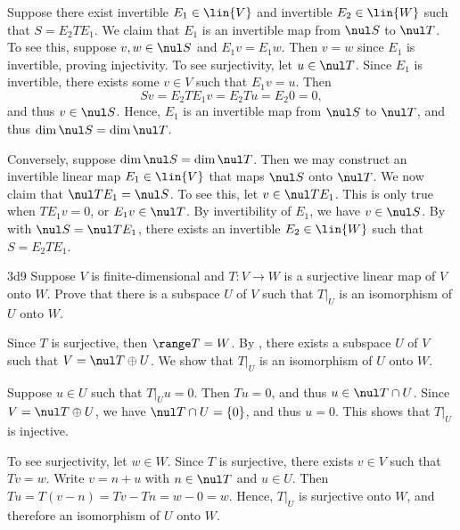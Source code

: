 \begin{sol}
    Suppose there exist invertible $E_1 \in \lin{V}$ and invertible $E_2 \in \lin{W}$ such that $S = E_2 T E_1$.
	We claim that $E_1$ is an invertible map from $\nul S$ to $\nul T$.
	To see this, suppose $v, w \in \nul S$ and $E_1 v = E_1 w$.
	Then $v = w$ since $E_1$ is invertible, proving injectivity.
	To see surjectivity, let $u \in \nul T$.
	Since $E_1$ is invertible, there exists some $v \in V$ such that $E_1 v = u$.
	Then
    \[
    	Sv = E_2 T E_1 v = E_2 T u = E_2 0 = 0,
    \]
    and thus $v \in \nul S$.
	Hence, $E_1$ is an invertible map from $\nul S$ to $\nul T$, and thus $\dim \nul S = \dim \nul T$.

    Conversely, suppose $\dim \nul S = \dim \nul T$.
	Then we may construct an invertible linear map $E_1 \in \lin{V}$ that maps $\nul S$ onto $\nul T$.
	We now claim that $\nul TE_1 = \nul S$.
	To see this, let $v \in \nul TE_1$.
	This is only true when $TE_1v = 0$, or $E_1v \in \nul T$.
	By invertibility of $E_1$, we have $v \in \nul S$.
	By  with $\nul S = \nul TE_1$, there exists an invertible $E_2 \in \lin{W}$ such that $S = E_2 TE_1$.
\end{sol}

\begin{exercise}{3d9}
    Suppose $V$ is finite-dimensional and $T: V \to W$ is a surjective linear map of $V$ onto $W$.
	Prove that there is a subspace $U$ of $V$ such that $T|_U$ is an isomorphism of $U$ onto $W$.
    
\end{exercise}

\begin{sol}
    Since $T$ is surjective, then $\range T = W$.
	By , there exists a subspace $U$ of $V$ such that $V = \nul T \oplus U$.
	We show that $T|_U$ is an isomorphism of $U$ onto $W$. 

    Suppose $u \in U$ such that $T|_Uu = 0$.
	Then $Tu = 0$, and thus $u \in \nul T \cap U$.
	Since $V = \nul T \oplus U$, we have $\nul T \cap U = \{0\}$, and thus $u = 0$.
	This shows that $T|_U$ is injective.

    To see surjectivity, let $w \in W$.
	Since $T$ is surjective, there exists $v \in V$ such that $Tv = w$.
	Write $v = n + u$ with $n \in \nul T$ and $u \in U$.
	Then $Tu = T(v - n) = Tv - Tn = w - 0 = w$.
	Hence, $T|_U$ is surjective onto $W$, and therefore an isomorphism of $U$ onto $W$.
\end{sol}

